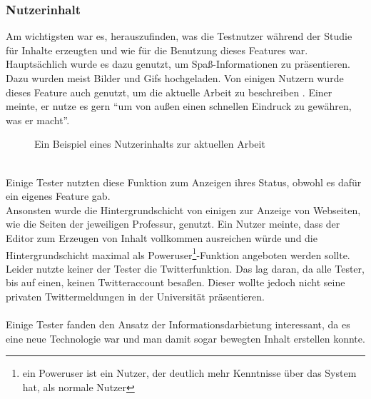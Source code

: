 \subsubsection{Nutzerinhalt}\label{Nutzerinhalt}
Am wichtigsten war es, herauszufinden, was die Testnutzer während der Studie für Inhalte erzeugten und wie für die Benutzung dieses Features war.
Hauptsächlich wurde es dazu genutzt, um Spaß-Informationen zu präsentieren.
Dazu wurden meist Bilder und Gifs hochgeladen.
Von einigen Nutzern wurde dieses Feature auch genutzt, um die aktuelle Arbeit zu beschreiben .
Einer meinte, er nutze es gern ``um von außen einen schnellen Eindruck zu gewähren, was er macht''.
\begin{figure}[h!]
  \centering
  \caption{Ein Beispiel eines Nutzerinhalts zur aktuellen Arbeit}
  \label{img:StudieExampleContent}
\end{figure}
\\
Einige Tester nutzten diese Funktion zum Anzeigen ihres Status, obwohl es dafür ein eigenes Feature gab.
\\
Ansonsten wurde die Hintergrundschicht von einigen zur Anzeige von Webseiten, wie die Seiten der jeweiligen Professur, genutzt.
Ein Nutzer meinte, dass der Editor zum Erzeugen von Inhalt vollkommen ausreichen würde und die Hintergrundschicht maximal als Poweruser\footnote{ein Poweruser ist ein Nutzer, der deutlich mehr Kenntnisse über das System hat, als normale Nutzer}-Funktion angeboten werden sollte.
\\
Leider nutzte keiner der Tester die Twitterfunktion.
Das lag daran, da alle Tester, bis auf einen, keinen Twitteraccount besaßen.
Dieser wollte jedoch nicht seine privaten Twittermeldungen in der Universität präsentieren.
\\
\\
Einige Tester fanden den Ansatz der Informationsdarbietung interessant, da es eine neue Technologie war und man damit sogar bewegten Inhalt erstellen konnte.
